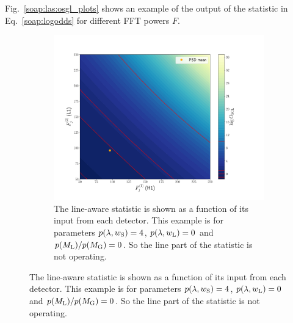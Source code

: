 Fig.~\ref{soap:las:osgl_plots} shows an example of the output of the statistic in Eq.~\ref{soap:logodds} for different \gls{FFT} powers $F$.
\begin{figure}
\centering

\begin{subfigure}[h]{\linewidth}
\begin{minipage}{0.65\linewidth}
\includegraphics[width=0.9\linewidth]{C3_soap/lookup_noline.pdf}
\end{minipage}\hfill
\begin{minipage}{0.35\linewidth}
\caption{The line-aware statistic is shown as a function of its input from each detector. This example is for parameters $p(\lambda,w_{\rm{S}}) = 4$, $p(\lambda,w_{\rm{L}}) = 0$ and $p(M_{\rm{L}})/p(M_{\rm{G}}) = 0$. So the line part of the statistic is not operating.}
\label{soap:las:detp:noline}
\end{minipage}
\end{subfigure}


\end{figure}
